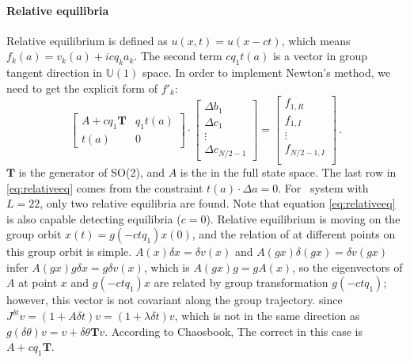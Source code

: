 \paragraph{Relative equilibria}
Relative equilibrium is defined as $u(x,t) = u(x-ct)$,
which means $f_{k}(a) = v_{k}(a) +icq_{k}a_{k}$. The second term  $cq_{1}t(a)$
is a vector in group tangent direction
in $\mathbb{U}(1)$ space. In order to implement Newton's method, we need to get the
explicit form of $f'_{k}$:
\begin{equation}
  \begin{bmatrix}
    A + cq_{1}\mathbf{T} & q_1  t(a) \\
    t(a) & 0
  \end{bmatrix}
  \cdot
  \begin{bmatrix}
    \Delta b_1 \\
    \Delta c_1 \\
    \vdots \\
    \Delta c_{N/2-1}
  \end{bmatrix}
  =
  \begin{bmatrix}
    f_{1,R} \\
    f_{1,I} \\
    \vdots \\
    f_{N/2-1,I}\\
  \end{bmatrix}
  \,.
  \label{eq:relativeeq}
\end{equation}
$\mathbf{T}$ is the generator of SO(2), and $A$ is the {\stabmat}
in the full state space. The last row in \ref{eq:relativeeq} comes from the
constraint $t(a)\cdot \Delta a = 0$. For \KS\ system with $L=22$, only two
relative equilibria
are found. Note that equation \ref{eq:relativeeq} is also capable
detecting equilibria ($c = 0$). Relative equilibrium is moving on the
group orbit $x(t)=g(-ctq_1)x(0)$, and the relation of {\stabmat}
at different points on this group orbit is simple.
$A(x)\delta x = \delta v(x)$ and $A(gx)\delta(gx)=\delta v(gx)$ infer
$A(gx)g\delta x = g\delta v(x)$, which is $A(gx)g=gA(x)$, so the
eigenvectors of $A$
at point $x$ and $g(-ctq_1)x$ are related by group transformation
$g(-ctq_1)$; however, this vector is not covariant along the group
trajectory. since $J^{\delta t}v=(1+A\delta t)v = (1+\lambda\delta t) v$,
which is not in the same direction as
$g(\delta \theta)v = v+\delta\theta \mathbf{T}v$. According to
Chaosbook, The correct {\stabmat} in this case is
$A+cq_1\mathbf{T}$.

